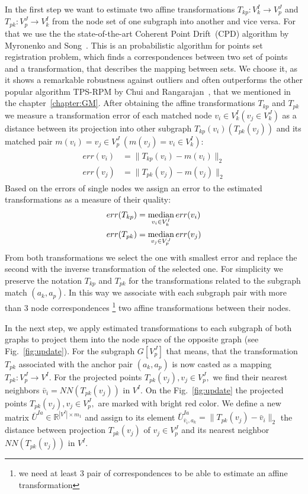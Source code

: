 In the first step we want to estimate two affine transformations $T_{kp}:V^I_k\rightarrow V^J_p$ and $T_{pk}:V^J_p\rightarrow V^I_k$ from the node set of one subgraph into another and vice versa. For that we use the  the state-of-the-art Coherent Point Drift~(CPD) algorithm by Myronenko and Song~\cite{Myronenko2009_CPD}. This is an probabilistic algorithm for points set registration problem, which finds a correspondences between two set of points and a transformation, that describes the mapping between sets. We choose it, as it shows a remarkable robustness against outliers and often outperforms the other popular algorithm TPS-RPM by Chui and Rangarajan~\cite{Chui2003}, that we mentioned in the chapter~\ref{chapter:GM}. After obtaining the affine transformations $T_{kp}$ and $T_{pk}$ we measure a transformation error of each matched node $v_i\in V^I_k (v_j\in V^J_k)$ as a distance between its projection into other subgraph $T_{kp}(v_i) (T_{pk}(v_j))$ and its matched pair $m(v_i) = v_j\in V^J_p\ (m(v_j) = v_i\in V^I_k)$:
\begin{align}\begin{split} \label{eq:err_v}
err(v_i) &= \|T_{kp}(v_i) - m(v_i)\|_{2}\\
err(v_j) &= \|T_{pk}(v_j) - m(v_j)\|_{2}
\end{split}\end{align}
Based on the errors of single nodes we assign an error to the estimated transformations as a measure of their quality:
\begin{equation}\begin{split} \label{eq:err_T}
err(T_{kp}) & = \mathop{\rm median}_{v_i\in V^I_k}err(v_i) \\
err(T_{pk}) & = \mathop{\rm median}_{v_j\in V^J_p}err(v_j)
\end{split}\end{equation}
From both transformations we select the one with smallest error and replace the second with the inverse transformation of the selected one. For simplicity we preserve the notation $T_{kp}$ and $T_{pk}$ for the transformations related to the subgraph match $(a_k, a_p)$. In this way we associate with each subgraph pair with more than $3$ node correspondences \footnote{we need at least $3$ pair of correspondences to be able to estimate an affine transformation} two affine transformations between their nodes.

In the next step, we apply estimated transformations to each subgraph of both graphs to project them into the node space of the opposite graph (see Fig.~\ref{fig:update}). For the subgraph $G[V^J_p]$ that means, that the transformation $T_{pk}$ associated with the anchor pair $(a_k,a_p)$ is now casted as a mapping $T_{pk}:V^J_p\rightarrow V^I$. For the projected points $T_{pk}(v_j),v_j\in V^J_p,$ we find their nearest neighbors $\bar{v}_i=NN(T_{pk}(v_j))$ in $V^I$. On the Fig.~\ref{fig:update} the projected points $T_{pk}(v_j),v_j\in V^J_p,$ are marked with bright red color. We define a new matrix $\bar{U}^{Ia}\in\mathbb{R}^{|V^I|\times m_1}$ and assign to its element $\bar{U}^{Ia}_{\bar{v}_i,a_k}=\|T_{pk}(v_j)-\bar{v}_i\|_2$ the distance between projection $T_{pk}(v_j)$ of $v_j\in V^J_p$ and its nearest neighbor $NN(T_{pk}(v_j))$ in $V^I$.

